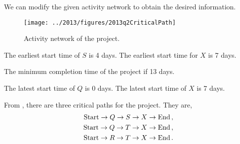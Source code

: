 %
%

\begin{subquestions}


\subquestion

We can modify the given activity network to obtain the desired information.
\begin{figure}[H]
	\begin{center}
		\texttt{[image: ../2013/figures/2013q2CriticalPath]}
		\caption{\label{2013:q2:fig:ActNet} Activity network of the project.}
	\end{center}
\end{figure}




\begin{subsubquestions}

\subsubquestion 

The earliest start time of $S$ is 4 days. The earliest start time for $X$ is 7 days.


\subsubquestion

The minimum completion time of the project if 13 days.


\subsubquestion

The latest start time of $Q$ is 0 days. The latest start time of $X$ is 7 days.


\subsubquestion

From , there are three critical paths for the project. They are,
\begin{align}
	\text{Start} \rightarrow Q \rightarrow S \rightarrow X \rightarrow \text{End}\,, \nonumber \\
	\text{Start} \rightarrow Q \rightarrow T \rightarrow X \rightarrow \text{End}\,, \nonumber \\
	\text{Start} \rightarrow R \rightarrow T \rightarrow X \rightarrow \text{End}\,.
\end{align}


\end{subsubquestions}
\end{subquestions}
